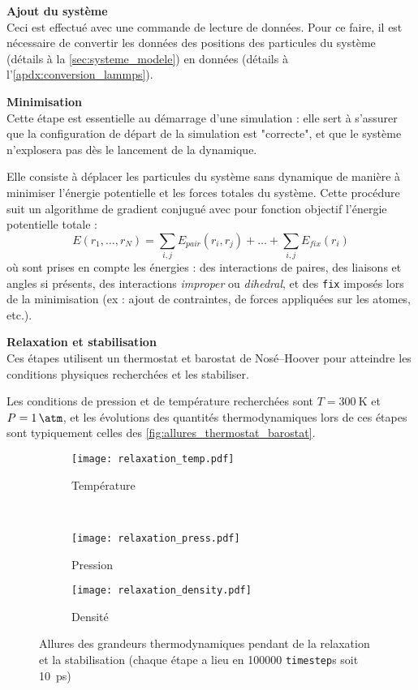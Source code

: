 \textbf{Ajout du système}\\
Ceci est effectué avec une commande \lammps de lecture de données. Pour ce faire, il est nécessaire de convertir les données des positions des particules du système (détails à la \autoref{sec:systeme_modele}) en données \lammps (détails à l'\autoref{apdx:conversion_lammps}).

\textbf{Minimisation}\\
Cette étape est essentielle au démarrage d'une simulation : elle sert à s'assurer que la configuration de départ de la simulation est "correcte", et que le système n'explosera pas dès le lancement de la dynamique.

Elle consiste à déplacer les particules du système sans dynamique de manière à minimiser l'énergie potentielle et les forces totales du système. Cette procédure suit un algorithme de gradient conjugué avec pour fonction objectif l'énergie potentielle totale :
\begin{equation*}
    E(r_1, \dots, r_N) = \sum_{i, j} E_{pair} (r_i, r_j) + \dots + \sum_{i, j} E_{fix} (r_i)
\end{equation*}
où sont prises en compte les énergies : des interactions de paires, des liaisons et angles si présents, des interactions \textit{improper} ou \textit{dihedral}, et des \lstinline!fix! imposés lors de la minimisation (ex : ajout de contraintes, de forces appliquées sur les atomes, etc.).

\textbf{Relaxation et stabilisation}\\
Ces étapes utilisent un thermostat et barostat de Nosé--Hoover pour atteindre les conditions physiques recherchées et les stabiliser.

Les conditions de pression et de température recherchées sont $T = \qty{300}{\kelvin}$ et $P = \qty{1}{\atm}$, et les évolutions des quantités thermodynamiques lors de ces étapes sont typiquement celles des \autoref{fig:allures_thermostat_barostat}.

\begin{figure}[h]
    \centering
    \begin{subfigure}[t]{.49\textwidth}
        \texttt{[image: relaxation\_temp.pdf]}
        \caption{Température}
    \end{subfigure}%
    ~
    \begin{subfigure}[t]{.49\textwidth}
        \texttt{[image: relaxation\_press.pdf]}
        \caption{Pression}
    \end{subfigure}
    \begin{subfigure}[t]{.49\textwidth}
        \texttt{[image: relaxation\_density.pdf]}
        \caption{Densité}
    \end{subfigure}
    \caption{Allures des grandeurs thermodynamiques pendant de la relaxation et la stabilisation {\tiny (chaque étape a lieu en \num{100000} \lstinline!timestep!s soit \qty{10}{\pico \second})}}
    \label{fig:allures_thermostat_barostat}
\end{figure}

